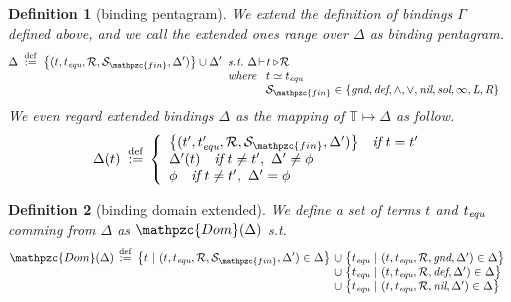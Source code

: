 \documentclass[12pt]{article}
\newtheorem{Definition}{Definition}[section]
\begin{document}
\begin{Definition}[binding pentagram]
  We extend the definition of bindings $\Gamma$ defined above,
  and we call the extended ones range over $\Delta$  as binding pentagram.
  \begin{displaymath}
    \Delta \;\stackrel{\mathrm{def}}{:=}\;
     \bigl\{(t, t_{\text{\it equ}}, \mathcal{R},
      \mathcal{S}_{\mathpzc{fin}}, \Delta') \bigr\} \cup \Delta'
      \begin{array}[t]{l}
        \text{\it s.t.}\ \Delta \!\vdash\! t \triangleright \!\mathcal{R} \\
        \text{\it where}\ \begin{array}[t]{l}
         t \simeq t_{\text{\it equ}}  \\
        \mathcal{S}_{\mathpzc{fin}}\in \{\text{\it gnd},
         \text{\it def}, \wedge, \vee, \text{\it nil}, \text{\it sol},
          \infty, \text{\it L}, \text{\it R}\}
        \end{array}
      \end{array}
  \end{displaymath}
  We even regard extended bindings $\Delta$ as the mapping of
  $\mathbb{T} \mapsto \Delta$ as follow.
  \begin{displaymath}
    \Delta(t) \;\stackrel{\mathrm{def}}{:=} \,\left\{\begin{array}{l}
      \bigl\{(t', t'_{\text{\it equ}}, \mathcal{R},
      \mathcal{S}_{\mathpzc{fin}}, \Delta') \bigr\}
       \quad \text{\it if}\ t = t'  \\
      \Delta'(t) \quad \text{\it if}\ t \neq t',\ \Delta' \neq \phi  \\
       \phi \quad \text{\it if}\ t \neq t',\ \Delta' = \phi
    \end{array}\right.
  \end{displaymath}  
\end{Definition}


\begin{Definition}[binding domain extended]
  We define a set of terms $t$ and $t_{\text{\it equ}}$ comming from
  $\Delta$ as $\mathpzc{Dom}(\Delta)$ s.t.
  \[ \mathpzc{Dom}(\Delta) \,\stackrel{\mathrm{def}}{:=}\,
  \bigl\{ t \ |\  (t, t_{\text{\it equ}}, \mathcal{R},
  \mathcal{S}_{\mathpzc{fin}}, \Delta') \in \Delta \bigr\}
  \!\begin{array}[t]{l}
    \cup\; \bigl\{t_{\text{\it equ}}  \ |\  (t, t_{\text{\it equ}},
     \mathcal{R},  \text{\it gnd}, \Delta') \in \Delta \bigr\}  \\
    \cup\; \bigl\{t_{\text{\it equ}}  \ |\  (t, t_{\text{\it equ}},
     \mathcal{R},  \text{\it def}, \Delta') \in \Delta \bigr\}  \\
    \cup\; \bigl\{t_{\text{\it equ}}  \ |\  (t, t_{\text{\it equ}},
     \mathcal{R}, \text{\it nil}, \Delta') \in \Delta \bigr\}
  \end{array}
  \]
\end{Definition}
\end{document}
